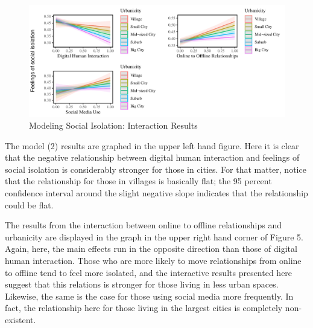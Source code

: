 \documentclass[
  letterpaper,
  DIV=11,
  numbers=noendperiod]{scrartcl}
\begin{document}
\begin{figure}

{\centering \includegraphics{Social-Isolation-in-China_files/figure-pdf/fig-social-isolation-interactions-1.pdf}

}

\caption{\label{fig-social-isolation-interactions}Modeling Social
Isolation: Interaction Results}

\end{figure}

The model (2) results are graphed in the upper left hand figure. Here it
is clear that the negative relationship between digital human
interaction and feelings of social isolation is considerably stronger
for those in cities. For that matter, notice that the relationship for
those in villages is basically flat; the 95 percent confidence interval
around the slight negative slope indicates that the relationship could
be flat.

The results from the interaction between online to offline relationships
and urbanicity are displayed in the graph in the upper right hand corner
of Figure 5. Again, here, the main effects run in the opposite direction
than those of digital human interaction. Those who are more likely to
move relationships from online to offline tend to feel more isolated,
and the interactive results presented here suggest that this relations
is stronger for those living in less urban spaces. Likewise, the same is
the case for those using social media more frequently. In fact, the
relationship here for those living in the largest cities is completely
non-existent.
\end{document}

